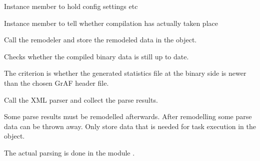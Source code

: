\documentclass[letterpaper,10pt,english]{sphinxmanual}
\begin{document}
\begin{fulllineitems}
\begin{fulllineitems}
\label{graf/graf:graf.compiler.GrafCompiler.env}
Instance member to hold config settings etc

\end{fulllineitems}


\begin{fulllineitems}
\label{graf/graf:graf.compiler.GrafCompiler.has_compiled}
Instance member to tell whether compilation has actually taken place

\end{fulllineitems}


\begin{fulllineitems}
\label{graf/graf:graf.compiler.GrafCompiler.model}
Call the remodeler and store the remodeled data in the object.

\end{fulllineitems}


\begin{fulllineitems}
\label{graf/graf:graf.compiler.GrafCompiler.needs_compiling}
Checks whether the compiled binary data is still up to date.

The criterion is whether the generated statistics file at the binary side is newer than the chosen GrAF header file.

\end{fulllineitems}


\begin{fulllineitems}
\label{graf/graf:graf.compiler.GrafCompiler.parse}
Call the XML parser and collect the parse results.

Some parse results must be remodelled afterwards.
After remodelling some parse data can be thrown away.
Only store data that is needed for task execution in the object.

The actual parsing is done in the module {\hyperref[graf/graf:module-graf.parse]{}}.


\end{fulllineitems}
\end{fulllineitems}
\end{document}
